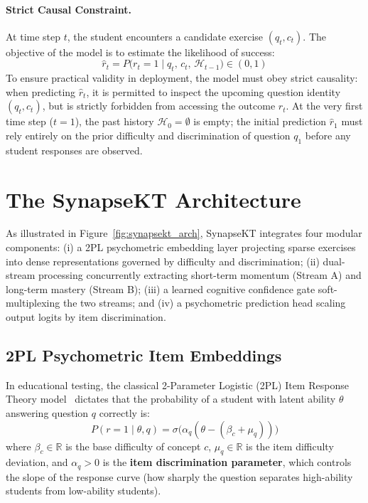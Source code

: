 \documentclass[11pt]{article}
\begin{document}
\paragraph{Strict Causal Constraint.}
At time step $t$, the student encounters a candidate exercise $(q_t, c_t)$. The objective of the model is to estimate the likelihood of success:
\begin{equation}
\hat{r}_t = P\big(r_t = 1 \mid q_t,\, c_t,\, \mathcal{H}_{t-1}\big) \in (0, 1)
\end{equation}
To ensure practical validity in deployment, the model must obey strict causality: when predicting $\hat{r}_t$, it is permitted to inspect the upcoming question identity $(q_t, c_t)$, but is strictly forbidden from accessing the outcome $r_t$. At the very first time step ($t=1$), the past history $\mathcal{H}_0 = \emptyset$ is empty; the initial prediction $\hat{r}_1$ must rely entirely on the prior difficulty and discrimination of question $q_1$ before any student responses are observed.

\section{The SynapseKT Architecture}
\label{sec:architecture}

As illustrated in Figure~\ref{fig:synapsekt_arch}, SynapseKT integrates four modular components: (i) a 2PL psychometric embedding layer projecting sparse exercises into dense representations governed by difficulty and discrimination; (ii) dual-stream processing concurrently extracting short-term momentum (Stream A) and long-term mastery (Stream B); (iii) a learned cognitive confidence gate soft-multiplexing the two streams; and (iv) a psychometric prediction head scaling output logits by item discrimination.

\subsection{2PL Psychometric Item Embeddings}
\label{sec:2pl_embed}

In educational testing, the classical 2-Parameter Logistic (2PL) Item Response Theory model~\citep{lord1980applications} dictates that the probability of a student with latent ability $\theta$ answering question $q$ correctly is:
\begin{equation}
P(r = 1 \mid \theta, q) = \sigma\big(\alpha_q (\theta - (\beta_c + \mu_q))\big)
\end{equation}
where $\beta_c \in \mathbb{R}$ is the base difficulty of concept $c$, $\mu_q \in \mathbb{R}$ is the item difficulty deviation, and $\alpha_q > 0$ is the \textbf{item discrimination parameter}, which controls the slope of the response curve (how sharply the question separates high-ability students from low-ability students).
\end{document}
